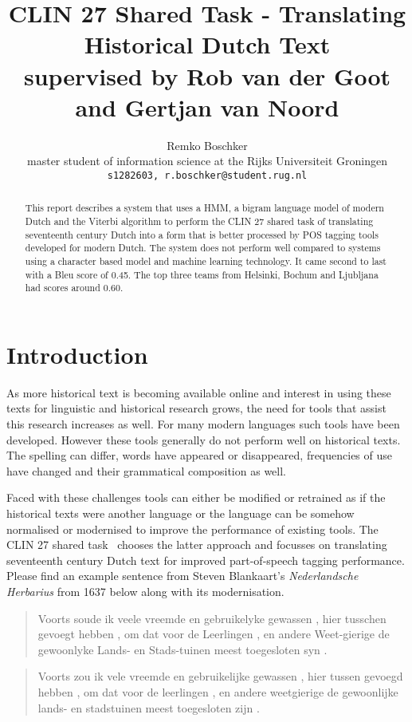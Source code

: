 \documentclass[11pt]{article}
\title{CLIN 27 Shared Task - Translating Historical Dutch Text\\
{\small supervised by Rob van der Goot and Gertjan van Noord}}
\author{Remko Boschker \\
  master student of information science at the Rijks Universiteit Groningen \\
  {\tt s1282603, r.boschker@student.rug.nl}}
\date{}
\begin{document}
\maketitle
\begin{abstract}

This report describes a system that uses a HMM, a bigram language model of modern Dutch and the Viterbi algorithm to perform the CLIN 27 shared task of translating seventeenth century Dutch into a form that is better processed by POS tagging tools developed for modern Dutch. The system does not perform well compared to systems using a character based model and machine learning technology. It came second to last with a Bleu score of 0.45. The top three teams from Helsinki, Bochum and Ljubljana had scores around 0.60.

\end{abstract}

\section{Introduction}

As more historical text is becoming available online and interest in using these texts for linguistic and historical research grows, the need for tools that assist this research increases as well. For many modern languages such tools have been developed. However these tools generally do not perform well on historical texts. The spelling can differ, words have appeared or disappeared, frequencies of use have changed and their grammatical composition as well.

Faced with these challenges tools can either be modified or retrained as if the historical texts were another language or the language can be somehow normalised or modernised to improve the performance of existing tools. The CLIN 27 shared task~\cite{clin27} chooses the latter approach and focusses on translating seventeenth century Dutch text for improved part-of-speech tagging performance. Please find an example sentence from Steven Blankaart's \emph{Nederlandsche Herbarius} from 1637 below along with its modernisation.

\begin{quote}
  Voorts soude ik veele vreemde en gebruikelyke gewassen , hier tusschen gevoegt hebben , om dat voor de Leerlingen , en andere Weet-gierige de gewoonlyke Lands- en Stads-tuinen meest toegesloten syn .
\end{quote}

\begin{quote}
  Voorts zou ik vele vreemde en gebruikelijke gewassen , hier tussen gevoegd hebben , om dat voor de leerlingen , en andere weetgierige de gewoonlijke lands- en stadstuinen meest toegesloten zijn .
\end{quote}
\end{document}
